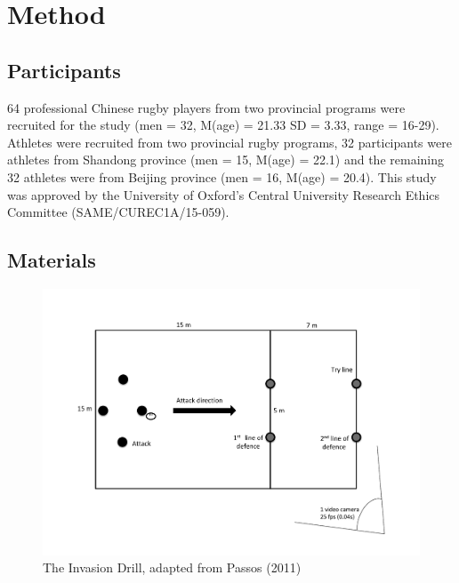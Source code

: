 
\section{Method}



\subsection{Participants}
64 professional Chinese rugby players from two provincial programs were recruited for the study (men = 32, M(age) = 21.33 SD = 3.33, range = 16-29).  Athletes were recruited from two provincial rugby programs, 32
participants were athletes from Shandong province (men = 15, M(age) = 22.1) and the remaining 32 athletes were from Beijing province (men = 16, M(age) = 20.4).  This study was approved by the University of Oxford’s Central University Research Ethics Committee (SAME/CUREC1A/15-059).


\subsection{Materials}


\begin{figure}[htbp]
  \centering
      \includegraphics[width=0.9\linewidth,keepaspectratio] {images/invasionDrill}
      \caption{The Invasion Drill, adapted from Passos (2011)}
      \label{fig:invasionDrill}
  \end{figure}


